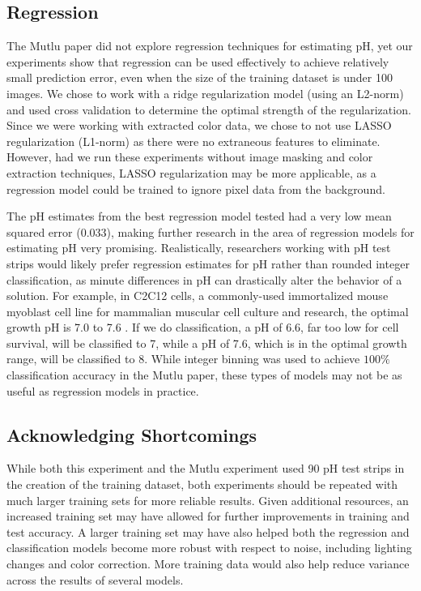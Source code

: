 \documentclass[journal]{IEEEtran}
\begin{document}
\subsection{Regression}
The Mutlu paper did not explore regression techniques for estimating pH, yet our experiments show that regression can be used effectively to achieve relatively small prediction error, even when the size of the training dataset is under 100 images. We chose to work with a ridge regularization model (using an L2-norm) and used cross validation to determine the optimal strength of the regularization. Since we were working with extracted color data, we chose to not use LASSO regularization (L1-norm) as there were no extraneous features to eliminate. However, had we run these experiments without image masking and color extraction techniques, LASSO regularization may be more applicable, as a regression model could be trained to ignore pixel data from the background.

The pH estimates from the best regression model tested had a very low mean squared error ($0.033$), making further research in the area of regression models for estimating pH very promising. Realistically, researchers working with pH test strips would likely prefer regression estimates for pH rather than rounded integer classification, as minute differences in pH can drastically alter the behavior of a solution. For example, in C2C12 cells, a commonly-used immortalized mouse myoblast cell line for mammalian muscular cell culture and research, the optimal growth pH is 7.0 to 7.6 \cite{product}. If we do classification, a pH of 6.6, far too low for cell survival, will be classified to 7, while a pH of 7.6, which is in the optimal growth range, will be classified to 8. While integer binning was used to achieve $100\%$ classification accuracy in the Mutlu paper, these types of models may not be as useful as regression models in practice. 

\subsection{Acknowledging Shortcomings}
While both this experiment and the Mutlu experiment used 90 pH test strips in the creation of the training dataset, both experiments should be repeated with much larger training sets for more reliable results. Given additional resources, an increased training set may have allowed for further improvements in training and test accuracy. A larger training set may have also helped both the regression and classification models become more robust with respect to noise, including lighting changes and color correction. More training data would also help reduce variance across the results of several models. 
\end{document}
